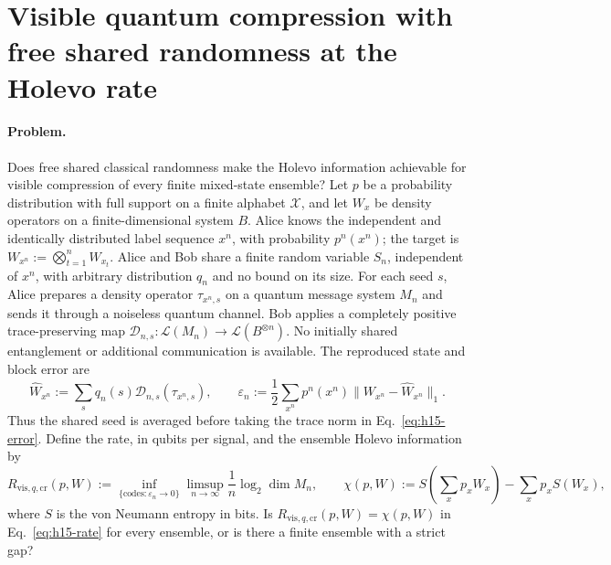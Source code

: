 \section{Visible quantum compression with free shared randomness at the Holevo rate}
\label{sec:op_1ab8b10386bddd66}

\paragraph{Problem.}
Does free shared classical randomness make the Holevo information achievable for visible compression of every finite mixed-state ensemble? Let $p$ be a probability distribution with full support on a finite alphabet $\mathcal X$, and let $W_x$ be density operators on a finite-dimensional system $B$. Alice knows the independent and identically distributed label sequence $x^n$, with probability $p^n(x^n)$; the target is $W_{x^n}:=\bigotimes_{t=1}^nW_{x_t}$. Alice and Bob share a finite random variable $S_n$, independent of $x^n$, with arbitrary distribution $q_n$ and no bound on its size. For each seed $s$, Alice prepares a density operator $\tau_{x^n,s}$ on a quantum message system $M_n$ and sends it through a noiseless quantum channel. Bob applies a completely positive trace-preserving map $\mathcal D_{n,s}:\mathcal L(M_n)\to\mathcal L(B^{\otimes n})$. No initially shared entanglement or additional communication is available. The reproduced state and block error are
\begin{equation}
 \widehat W_{x^n}:=\sum_s q_n(s)\mathcal D_{n,s}(\tau_{x^n,s}),\qquad
 \varepsilon_n:=\frac12\sum_{x^n}p^n(x^n)\|W_{x^n}-\widehat W_{x^n}\|_1.
 \label{eq:h15-error}
\end{equation}
Thus the shared seed is averaged before taking the trace norm in Eq.~\eqref{eq:h15-error}. Define the rate, in qubits per signal, and the ensemble Holevo information by
\begin{equation}
 R_{\mathrm{vis},q,\mathrm{cr}}(p,W):=\inf_{\{\text{codes}:\varepsilon_n\to0\}}\limsup_{n\to\infty}\frac1n\log_2\dim M_n,
 \qquad
 \chi(p,W):=S\!\left(\sum_xp_xW_x\right)-\sum_xp_xS(W_x),
 \label{eq:h15-rate}
\end{equation}
where $S$ is the von Neumann entropy in bits. Is $R_{\mathrm{vis},q,\mathrm{cr}}(p,W)=\chi(p,W)$ in Eq.~\eqref{eq:h15-rate} for every ensemble, or is there a finite ensemble with a strict gap?

